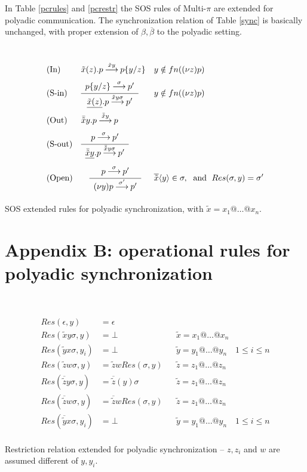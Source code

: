 \documentclass[submission,copyright,creativecommons]{eptcs}
\newcommand{\sost}[2]{\mbox{$\{#1/#2\}$}}
\newcommand{\deriv}[1]{{\mbox{${\:\stackrel{#1}{\longrightarrow}\:}$}}}
\newcommand{\bigfrac}[2]{
\renewcommand{\arraystretch}{1.5}
\begin{array}{c}#1\\
\hline
#2
\end{array}}
\newcommand{\restr}[1]{\mbox{$({\bf\nu} #1)$}}
\newcommand{\undef}{\mbox{$\bot$}}
\newcommand{\vect}[1]{\ensuremath{\tilde{#1}}}
\begin{document}
In Table \ref{pcrules} and \ref{pcrestr} the SOS rules of Multi-$\pi$ are extended for polyadic communication. The synchronization relation of Table \ref{sync} is basically unchanged, with proper extension of $\beta, \overline{\beta}$ to the polyadic %
setting.



\begin{table}
\hrulefill\\[-.8cm]

\begin{align*}
& \mbox{(In)}    & &  \vect x(z).p\deriv{\vect xy}p\sost{y}{z} & &  y \notin fn(\restr{z}p) \\
& \mbox{(S-in)}  & & \bigfrac{p\sost{y}{z}\deriv{\sigma}p'}{\underline{\vect x(z)}.p\deriv{\vect xy\sigma}p'} & & y \notin fn(\restr{z}p)\\
& \mbox{(Out)}  & & \bar{\vect x}y.p\deriv{\bar{\vect x}y}p \\
& \mbox{(S-out)} & & \bigfrac{p\deriv{\sigma}p'}{\underline{\bar{\vect x}y}.p\deriv{\bar{\vect x}y\sigma}p'} \\
& \mbox{(Open)} & & \quad \bigfrac{p\deriv{\sigma}p'}{\restr{y}p\deriv{\sigma'}
p'} & &  \overline{\vect x} \langle y \rangle \in \sigma, \;  \mbox{ and }  \; Res(\sigma, y)= \sigma'  
\end{align*}
\hrulefill
\caption{SOS extended rules for polyadic synchronization, with $\vect x = x_1@\ldots@x_n$.}\label{psrules}
\end{table}

\section*{Appendix B: operational rules for polyadic synchronization}


\begin{table}
\hrulefill\\[-.7cm]
{\renewcommand{\arraystretch}{3}}

\begin{align*}
Res(\epsilon, y) & = \epsilon \\
Res(\vect x y \sigma, y) & = \undef & & \vect x = x_1@\ldots@x_n \\
%
Res(\vect y x \sigma, y_i) & = \undef & & \vect y = y_1@\ldots@y_n \quad 1 \leq i \leq n \\
Res(\vect z w \sigma, y)   & = \vect z w  Res(\sigma, y) & & \vect z = z_1@\ldots@z_n \\
%
Res(\overline{\vect z } y \sigma, y) & = \overline{\vect z} ( y ) \sigma  & & \vect z = z_1@\ldots@z_n \\
Res(\overline{\vect z} w  \sigma, y) & = \overline{\vect z} w Res(\sigma, y)  & & \vect z = z_1@\ldots@z_n \\
Res(\overline{\vect y} x \sigma, y_i) & = \undef  & & \vect y = y_1@\ldots@y_n \quad 1 \leq i \leq n \\[-.7cm]
\end{align*}

\hrulefill
\caption{Restriction relation extended for polyadic synchronization -- $z, z_i$ and $w$ are assumed different of $y, y_i$.}\label{psrestr}
\end{table}
\end{document}
